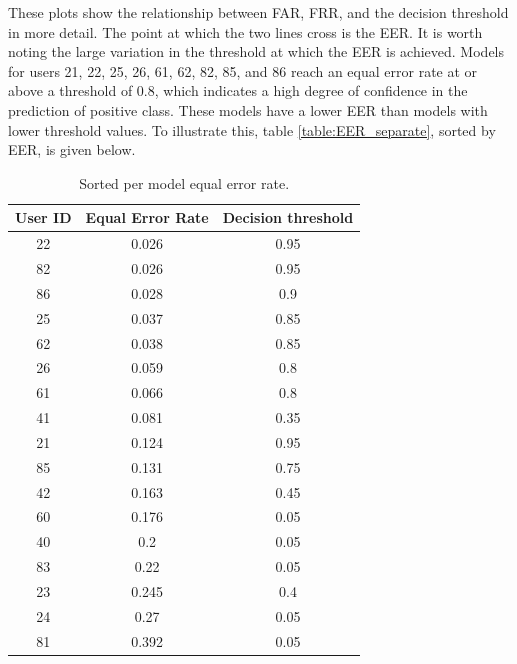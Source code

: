These plots show the relationship between FAR, FRR, and the decision threshold in more detail. The point at which the two lines cross is the EER. It is worth noting the large variation in the threshold at which the EER is achieved. Models for users 21, 22, 25, 26, 61, 62, 82, 85, and 86 reach an equal error rate at or above a threshold of 0.8, which indicates a high degree of confidence in the prediction of positive class. These models have a lower EER than models with lower threshold values. To illustrate this, table \ref{table:EER_separate}, sorted by EER, is given below.

\begin{center}
	\begin{table}[H]
		\begin{center}
			\begin{tabular}{ |c|c|c| } 
				\hline
				User ID & Equal Error Rate & Decision threshold \\
				\hline
				\hline
				22 & 0.026 & 0.95 \\
				\hline
				82 & 0.026 & 0.95 \\
				\hline
				86 & 0.028 & 0.9 \\
				\hline
				25 & 0.037 & 0.85 \\
				\hline
				62 & 0.038 & 0.85 \\
				\hline
				26 & 0.059 & 0.8 \\
				\hline
				61 & 0.066 & 0.8 \\
				\hline
				41 & 0.081 & 0.35 \\
				\hline
				21 & 0.124 & 0.95 \\
				\hline
				85 & 0.131 & 0.75 \\
				\hline
				42 & 0.163 & 0.45 \\
				\hline
				60 & 0.176 & 0.05 \\
				\hline
				40 & 0.2 & 0.05 \\
				\hline
				83 & 0.22 & 0.05 \\
				\hline
				23 & 0.245 & 0.4 \\
				\hline
				24 & 0.27 & 0.05 \\
				\hline
				81 & 0.392 & 0.05 \\
				\hline
			\end{tabular}
		\end{center}
		\caption{Sorted per model equal error rate.}
		\label{table:EER_separate_sorted}
	\end{table}
\end{center}

